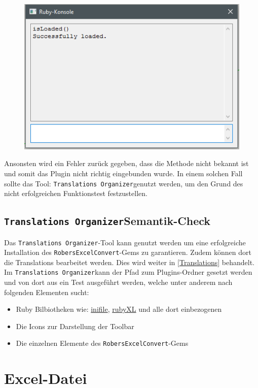 \documentclass{book}
\newcommand{\robersexcelconvert}{\texttt{RobersExcelConvert}\xspace}
\newcommand{\assisttool}{\texttt{Translations Organizer}}
\begin{document}
			\begin{figure}[H]
				\centering
				\includegraphics[scale=0.6]{pics/funktionstest.png}
				\label{funktionstest-success}
			\end{figure}
			
			Ansonsten wird ein Fehler zurück gegeben, dass die Methode nicht bekannt ist und somit das Plugin nicht richtig eingebunden wurde. In einem solchen Fall sollte das Tool: \assisttool genutzt werden, um den Grund des nicht erfolgreichen Funktionstest festzustellen.
	
		\section{\assisttool Semantik-Check}
		Das \assisttool-Tool kann genutzt werden um eine erfolgreiche Installation des \robersexcelconvert-Gems zu garantieren. Zudem können dort die Translations bearbeitet werden. Dies wird weiter in \ref{Translations} behandelt.\\
		Im \assisttool kann der Pfad zum Plugins-Ordner gesetzt werden und von dort aus ein Test ausgeführt werden, welche unter anderem nach folgenden Elementen sucht:
			\begin{itemize}
				\item Ruby Bilbiotheken wie: \hyperref[inifile]{inifile}, \hyperref[rubyXL]{rubyXL} und alle dort einbezogenen
				\item Die Icons zur Darstellung der Toolbar
				\item Die einzelnen Elemente des \robersexcelconvert-Gems
			\end{itemize}
	\chapter{Excel-Datei}
\end{document}
